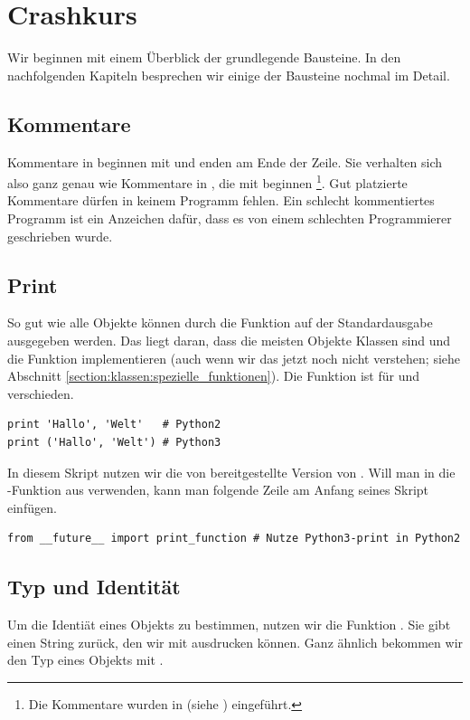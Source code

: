\section{Crashkurs}
\label{section:crashkurs}
Wir beginnen mit einem Überblick der grundlegende Bausteine.
In den nachfolgenden Kapiteln besprechen wir einige der Bausteine nochmal im Detail.


\subsection{Kommentare}
\label{section:crashkurs:kommentare}
Kommentare in \Python beginnen mit \lpy{#} und enden am Ende der Zeile.
Sie verhalten sich also ganz genau wie Kommentare in \CC, die mit \lcpp{//} beginnen%
\footnote{Die Kommentare \lcpp{//} wurden in \CNeunundneunzig (siehe \cite{C99}) eingeführt.}.
Gut platzierte Kommentare dürfen in keinem Programm fehlen.
Ein schlecht kommentiertes Programm ist ein Anzeichen dafür, dass es von einem schlechten Programmierer geschrieben wurde.


\subsection{Print}
\label{section:crashkurs:print}
So gut wie alle Objekte können durch die \Python Funktion  auf der Standardausgabe ausgegeben werden.
Das liegt daran, dass die meisten Objekte Klassen sind und die Funktion  implementieren (auch wenn wir das jetzt noch nicht verstehen; siehe Abschnitt \ref{section:klassen:spezielle_funktionen}).
Die Funktion  ist für \PythonZwei und \PythonDrei verschieden.
\begin{lstlisting}
print 'Hallo', 'Welt'   # Python2
print ('Hallo', 'Welt') # Python3
\end{lstlisting}
In diesem Skript nutzen wir die von \PythonDrei bereitgestellte Version von .
Will man in \PythonZwei die -Funktion aus \PythonDrei verwenden, kann man folgende Zeile am Anfang seines Skript einfügen.
\begin{lstlisting}
from __future__ import print_function # Nutze Python3-print in Python2
\end{lstlisting}


\subsection{Typ und Identität}
\label{section:crashkurs:typ_und_id}
Um die Identiät eines Objekts  zu bestimmen, nutzen wir die Funktion .
Sie gibt einen String zurück, den wir mit  ausdrucken können.
Ganz ähnlich bekommen wir den Typ eines Objekts mit .


